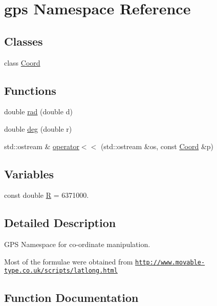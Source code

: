 \hypertarget{namespacegps}{}\section{gps Namespace Reference}
\label{namespacegps}
\subsection*{Classes}
\begin{DoxyCompactItemize}
\item 
class \hyperlink{classgps_1_1Coord}{Coord}
\end{DoxyCompactItemize}
\subsection*{Functions}
\begin{DoxyCompactItemize}
\item 
double \hyperlink{namespacegps_ad44ea39876137fc96774486e3a60f004}{rad} (double d)
\item 
double \hyperlink{namespacegps_a5c00877fe5fce323f1c834c324018c8f}{deg} (double r)
\item 
std\+::ostream \& \hyperlink{namespacegps_a5fb543469635387159ce1b8e24f6f78a}{operator$<$$<$} (std\+::ostream \&os, const \hyperlink{classgps_1_1Coord}{Coord} \&p)
\end{DoxyCompactItemize}
\subsection*{Variables}
\begin{DoxyCompactItemize}
\item 
const double \hyperlink{namespacegps_a336bcadf804afba736e0cf773b5a36e8}{R} = 6371000.
\end{DoxyCompactItemize}


\subsection{Detailed Description}
G\+PS Namespace for co-\/ordinate manipulation.

Most of the formulae were obtained from \href{http://www.movable-type.co.uk/scripts/latlong.html}{\tt http\+://www.\+movable-\/type.\+co.\+uk/scripts/latlong.\+html} 

\subsection{Function Documentation}
\mbox{\label{namespacegps_a5c00877fe5fce323f1c834c324018c8f}} 
